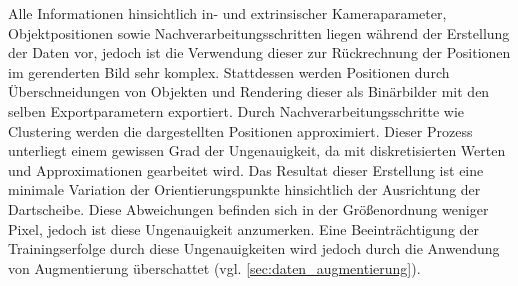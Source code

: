 Alle Informationen hinsichtlich in- und extrinsischer Kameraparameter, Objektpositionen sowie Nachverarbeitungsschritten liegen während der Erstellung der Daten vor, jedoch ist die Verwendung dieser zur Rückrechnung der Positionen im gerenderten Bild sehr komplex. Stattdessen werden Positionen durch Überschneidungen von Objekten und Rendering dieser als Binärbilder mit den selben Exportparametern exportiert. Durch Nachverarbeitungsschritte wie Clustering werden die dargestellten Positionen approximiert. Dieser Prozess unterliegt einem gewissen Grad der Ungenauigkeit, da mit diskretisierten Werten und Approximationen gearbeitet wird. Das Resultat dieser Erstellung ist eine minimale Variation der Orientierungspunkte hinsichtlich der Ausrichtung der Dartscheibe. Diese Abweichungen befinden sich in der Größenordnung weniger Pixel, jedoch ist diese Ungenauigkeit anzumerken. Eine Beeinträchtigung der Trainingserfolge durch diese Ungenauigkeiten wird jedoch durch die Anwendung von Augmentierung überschattet (vgl. \autoref{sec:daten_augmentierung}).
